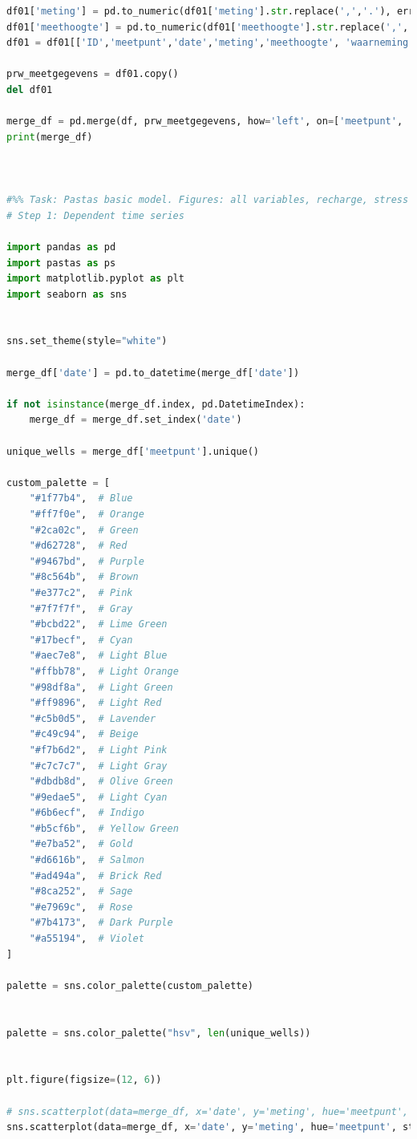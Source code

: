 \begin{lstlisting}[language=Python]
df01['meting'] = pd.to_numeric(df01['meting'].str.replace(',','.'), errors='coerce') 
df01['meethoogte'] = pd.to_numeric(df01['meethoogte'].str.replace(',','.'), errors='coerce') 
df01 = df01[['ID','meetpunt','date','meting','meethoogte', 'waarneming']]

prw_meetgegevens = df01.copy()
del df01

merge_df = pd.merge(df, prw_meetgegevens, how='left', on=['meetpunt', 'date', 'meting'])
print(merge_df)



#%% Task: Pastas basic model. Figures: all variables, recharge, stress models. 
# Step 1: Dependent time series 

import pandas as pd
import pastas as ps
import matplotlib.pyplot as plt
import seaborn as sns 


sns.set_theme(style="white")

merge_df['date'] = pd.to_datetime(merge_df['date'])

if not isinstance(merge_df.index, pd.DatetimeIndex):
    merge_df = merge_df.set_index('date')
    
unique_wells = merge_df['meetpunt'].unique()

custom_palette = [
    "#1f77b4",  # Blue
    "#ff7f0e",  # Orange
    "#2ca02c",  # Green
    "#d62728",  # Red
    "#9467bd",  # Purple
    "#8c564b",  # Brown
    "#e377c2",  # Pink
    "#7f7f7f",  # Gray
    "#bcbd22",  # Lime Green
    "#17becf",  # Cyan
    "#aec7e8",  # Light Blue
    "#ffbb78",  # Light Orange
    "#98df8a",  # Light Green
    "#ff9896",  # Light Red
    "#c5b0d5",  # Lavender
    "#c49c94",  # Beige
    "#f7b6d2",  # Light Pink
    "#c7c7c7",  # Light Gray
    "#dbdb8d",  # Olive Green
    "#9edae5",  # Light Cyan
    "#6b6ecf",  # Indigo
    "#b5cf6b",  # Yellow Green
    "#e7ba52",  # Gold
    "#d6616b",  # Salmon
    "#ad494a",  # Brick Red
    "#8ca252",  # Sage
    "#e7969c",  # Rose
    "#7b4173",  # Dark Purple
    "#a55194",  # Violet
]

palette = sns.color_palette(custom_palette)


palette = sns.color_palette("hsv", len(unique_wells))


plt.figure(figsize=(12, 6))

# sns.scatterplot(data=merge_df, x='date', y='meting', hue='meetpunt', style='meetpunt', markers='o', s=10, palette='tab10')
sns.scatterplot(data=merge_df, x='date', y='meting', hue='meetpunt', style='meetpunt', markers='o', s=20, palette=palette)



\end{lstlisting}
